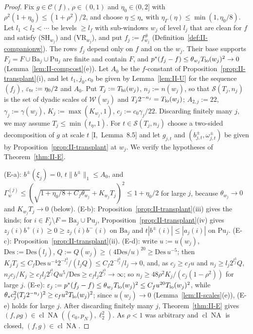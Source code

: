 \documentclass[10pt]{amsart}
\theoremstyle{definition}
\theoremstyle{remark}
\newcommand{\NA}{\operatorname{NA}}
\newcommand{\Cset}{\mathcal C}
\newcommand{\cl}{\operatorname{cl}}
\begin{document}
\begin{proof}
Fix $g\in\Cset(f)$, $\rho\in(0,1)$ and $\eta_0\in(0,2]$ with $\rho^2(1+\eta_0)
\le(1+\rho^2)/2$, and choose $\eta\le\eta_*$ with $\eta_\Gamma(\eta)\le
\min(1,\eta_0/8)$.  Let $l_1<l_2<\cdots$ be levels $\ge l_f$ with sub-windows
$w_j$ of level $l_j$ that are clean for $f$ and satisfy (SH$_{w_j}$) and
(VR$_{w_j}$), and put $f_j:=f^\#_{w_j}$ (Definition~\ref{def:II-companionw}).
The rows $f_j$ depend only on $f$ and on the $w_j$.  Their base supports
$F_j=F\cup\mathrm{Ba}_j\cup\mathrm{Pu}_j$ are finite and contain $F$, and
$p^*(f_j-f)\le\theta_{w_j}T_{\rm lo}(w_j)^2\to0$
(Lemma~\ref{lem:II-compcost}(e)).  Let $A_0$ be the $f$-constant of
Proposition~\ref{prop:II-transplant}(i), and let $t_1,j_0,c_0$ be given by
Lemma~\ref{lem:II-U} for the sequence $(f_j)$, $\varepsilon_{\rm tr}:=
\eta_0/2$ and $A_0$.  Put $T_j:=T_{\rm hi}(w_j)$, $n_j:=n(w_j)$, so that
$\mathcal S(T_j,n_j)$ is the set of dyadic scales of $\mathcal W(w_j)$ and
$T_j2^{-n_j}=T_{\rm lo}(w_j)$; $A_{2,j}:=22$, $\gamma_j:=\gamma(w_j)$,
$K_j:=\max(K_{w_j},1)$, $c_j:=c_0\gamma_j/22$.  Discarding finitely many $j$,
we may assume $T_j\le\min(t_\eta,1)$.  For $t\in\mathcal S(T_j,n_j)$ choose a
two-sided decomposition of $g$ at scale $t$ [I,~Lemma~8.5] and let
$g_{j,t}$ and $(b^\pm_{j,t},\omega^\pm_{j,t})$ be given by
Proposition~\ref{prop:II-transplant} at $w_j$.  We verify the hypotheses of
Theorem~\ref{thm:II-E}.

(E-a): $b^\pm(\xi_j)=0$, $t\|b^\pm\|_1\le A_0$, and
$\Gamma^{(j)}_w\le(\sqrt{1+\eta_0/8+C_f\theta_{w_j}}+K_{w_j}T_j)^2\le1+
\eta_0/2$ for large $j$, because $\theta_{w_j}\to0$ and $K_{w_j}T_j\to0$
(below).  (E-b): Proposition~\ref{prop:II-transplant}(iii) gives the kinds;
for $i\in F_j\setminus F=\mathrm{Ba}_j\cup\mathrm{Pu}_j$,
Proposition~\ref{prop:II-transplant}(iv) gives $z_j(i)b^+(i)\ge0\ge
z_j(i)b^-(i)$ on $\mathrm{Ba}_j$ and $t|b^\pm(i)|\le|a_j(i)|$ on
$\mathrm{Pu}_j$.  (E-c): Proposition~\ref{prop:II-transplant}(ii).  (E-d):
write $u:=u(w_j)$, $\mathrm{Des}:=\mathrm{Des}(l_j)$, $Q:=Q(w_j)\ge
(4\mathrm{Des}/u)^{20}\ge\mathrm{Des}\,u^{-5}$; then $K_jT_j\le C_f
\mathrm{Des}\,u^{-4}2^{-l_j^3}/(l_jQ)\le C_f2^{-l_j^3}/l_j\to0$, and, as
$c_j\ge c_fu$ and $n_j\ge l_j2^{l_j^3}Q$,
$n_jc_j/K_j\ge c_fl_j2^{l_j^3}Qu^5/\mathrm{Des}\ge c_fl_j2^{l_j^3}\to\infty$;
so $n_j\ge48\rho^2K_j/(c_j(1-\rho^2))$ for large $j$.  (E-e):
$\varepsilon_j:=p^*(f_j-f)\le\theta_{w_j}T_{\rm lo}(w_j)^2\le C_fu^{20}
T_{\rm lo}(w_j)^2$, while $\theta_*c_j^2(T_j2^{-n_j})^2\ge c_fu^2
T_{\rm lo}(w_j)^2$; since $u(w_j)\to0$ (Lemma~\ref{lem:II-scales}(e)), (E-e)
holds for large $j$.  After discarding finitely many $j$,
Theorem~\ref{thm:II-E} gives $(f,\rho g)\in\cl\NA((c_0,p_N),\ell_2^2)$.  As
$\rho<1$ was arbitrary and $\cl\NA$ is closed, $(f,g)\in\cl\NA$.
\end{proof}
\end{document}
